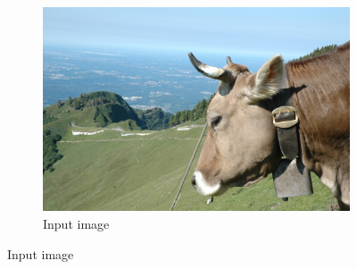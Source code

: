 \documentclass[a4paper]{article}
\begin{document}
\begin{figure}[ht]
	\centering
	\begin{subfigure}[h]{0.48\textwidth}
		\centering
		\includegraphics[width=\textwidth]{imgs/cow.jpg}
		\caption*{Input image}
	\end{subfigure}
	

\end{figure}
\end{document}
